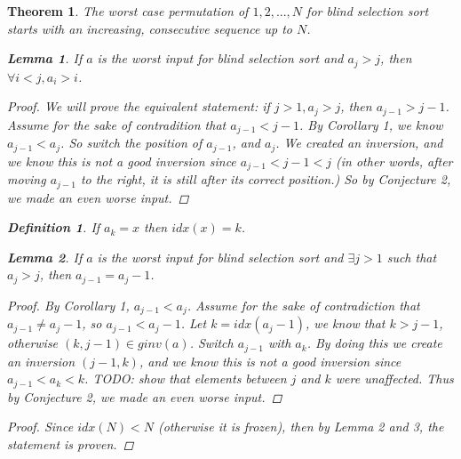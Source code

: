 \documentclass{article}
\newtheorem{lemma}{Lemma}
\newtheorem{theorem}{Theorem}
\newtheorem{definition}{Definition}
\begin{document}
\begin{theorem}
    The worst case permutation of $1, 2, ..., N$ for blind selection sort starts with an increasing, consecutive sequence up to $N$.
    \begin{lemma}
        If $a$ is the worst input for blind selection sort and $a_j > j$, then $ \forall i < j, a_i > i$.
        \begin{proof}
            We will prove the equivalent statement: if $j > 1, a_j > j$, then $a_{j - 1} > j - 1$.
            Assume for the sake of contradition
            that $a_{j - 1} < j - 1$. By Corollary 1, we know $a_{j - 1} < a_j$. So switch the position of
            $a_{j - 1}$, and $a_j$. We created an inversion, and we know this is not a good inversion since
            $a_{j - 1} < j - 1 < j $  (in other words, after moving $a_{j - 1}$ to the right, it is still after
            its correct position.) So by Conjecture 2, we made an even worse input.
        \end{proof}
    \end{lemma}
    \begin{definition}
        If $a_k = x$ then  $idx(x) = k$.
    \end{definition}
    \begin{lemma}
        If $a$ is the worst input for blind selection sort and $\exists j > 1$ such that $a_j > j$, then $ a_{j-1} = a_j - 1$.
        \begin{proof}
            By Corollary 1, $a_{j - 1} < a_j$. Assume for the sake of contradiction that $a_{j - 1} \neq a_j - 1$,
            so $a_{j - 1} < a_j - 1$. 
            Let $k = idx(a_j - 1)$, we know that $k > j - 1$, otherwise $(k, j - 1) \in ginv(a)$. Switch
            $a_{j - 1}$ with $a_k$. By doing this we create an inversion $(j - 1, k)$, and we know this is not
            a good inversion since $a_{j - 1} < a_k < k$. TODO: show that elements between $j$ and $k$ 
            were unaffected. Thus by Conjecture 2, we made an even worse input.
        \end{proof}
    \end{lemma}
    \begin{proof}
        Since $idx(N) < N$ (otherwise it is frozen), then by Lemma 2 and 3, the statement is proven.
    \end{proof}
\end{theorem}
\end{document}
